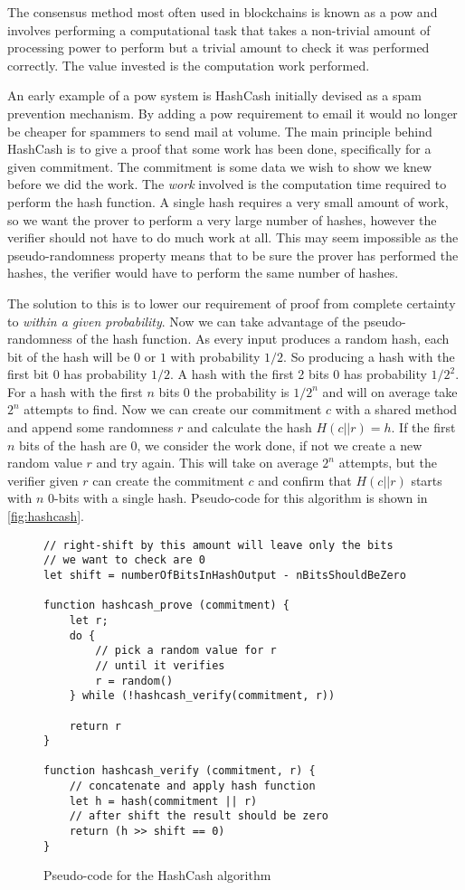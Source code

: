 The consensus method most often used in blockchains is known as a \gls{pow} and involves performing a computational task that takes a non-trivial amount of processing power to perform but a trivial amount to check it was performed correctly. The value invested is the computation work performed.

An early example of a \gls{pow} system is HashCash \cite{backHashcashDenialService2002} initially devised as a spam prevention mechanism. By adding a \gls{pow} requirement to email it would no longer be cheaper for spammers to send mail at volume. The main principle behind HashCash is to give a proof that some work has been done, specifically for a given commitment. The commitment is some data we wish to show we knew before we did the work. The \emph{work} involved is the computation time required to perform the hash function. A single hash requires a very small amount of work, so we want the prover to perform a very large number of hashes, however the verifier should not have to do much work at all. This may seem impossible as the pseudo-randomness property means that to be sure the prover has performed the hashes, the verifier would have to perform the same number of hashes.

The solution to this is to lower our requirement of proof from complete certainty to \emph{within a given probability}. Now we can take advantage of the pseudo-randomness of the hash function. As every input produces a random hash, each bit of the hash will be $0$ or $1$ with probability $1/2$. So producing a hash with the first bit $0$ has probability $1/2$. A hash with the first 2 bits $0$ has probability $1/2^2$. For a hash with the first $n$ bits $0$ the probability is $1/2^n$ and will on average take $2^n$ attempts to find. Now we can create our commitment $c$ with a shared method and append some randomness $r$ and calculate the hash $H(c || r) = h$. If the first $n$ bits of the hash are 0, we consider the work done, if not we create a new random value $r$ and try again. This will take on average $2^n$ attempts, but the verifier given $r$ can create the commitment $c$ and confirm that $H(c || r)$ starts with $n$ 0-bits with a single hash. Pseudo-code for this algorithm is shown in \autoref{fig:hashcash}.

\begin{figure}[h]
    \centering
    \begin{lstlisting}[style=ES6, language=ES6]
// right-shift by this amount will leave only the bits
// we want to check are 0
let shift = numberOfBitsInHashOutput - nBitsShouldBeZero

function hashcash_prove (commitment) {
    let r;
    do {
        // pick a random value for r
        // until it verifies
        r = random()
    } while (!hashcash_verify(commitment, r))

    return r
}

function hashcash_verify (commitment, r) {
    // concatenate and apply hash function
    let h = hash(commitment || r)
    // after shift the result should be zero
    return (h >> shift == 0)
}
        \end{lstlisting}
    \caption{Pseudo-code for the HashCash algorithm}
    \label{fig:hashcash}
\end{figure}

